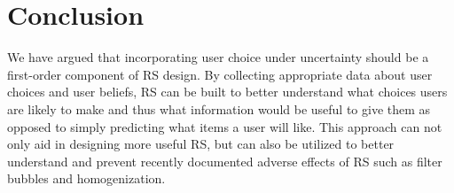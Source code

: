 \documentclass[sigconf]{acmart}
\begin{document}
\section{Conclusion}

We have argued that incorporating user choice under uncertainty should be a first-order component of RS design. By collecting appropriate data about user choices and user beliefs, RS can be built to better understand what choices users are likely to make and thus what information would be useful to give them as opposed to simply predicting what items a user will like. This approach can not only aid in designing more useful RS, but can also be utilized to better understand and prevent recently documented adverse effects of RS such as filter bubbles and homogenization.



\end{document}
